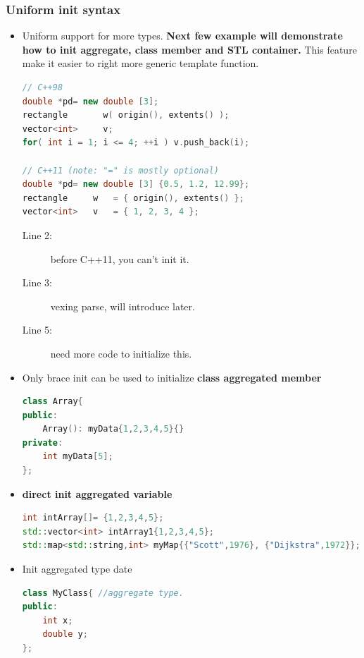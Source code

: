 \documentclass[a4paper,11pt,twoside]{book}
\begin{document}
\subsubsection{Uniform init syntax}
\begin{itemize}

\item Uniform support for more types. \textbf{Next few example will demonstrate how to init aggregate, class member and STL container.} This feature make it easier to right more generic template function. 
\begin{lstlisting}[frame=single, language=c++,mathescape=true]
// C++98 
double *pd= new double [3];
rectangle       w( origin(), extents() );     
vector<int>     v;
for( int i = 1; i <= 4; ++i ) v.push_back(i);

// C++11 (note: "=" is mostly optional)
double *pd= new double [3] {0.5, 1.2, 12.99};
rectangle     w   = { origin(), extents() }; 
vector<int>   v   = { 1, 2, 3, 4 };
\end{lstlisting}
\begin{description}
	\item[Line 2:] before C++11, you can't init it.
	
	\item[Line 3:] vexing parse, will introduce later.
	
	\item[Line 5:] need more code  to initialize this.
\end{description}
	
	\item Only brace init can be used to initialize \textbf{class aggregated member}

\begin{lstlisting}[frame=single, language=c++,mathescape=true]
class Array{
public:
	Array(): myData{1,2,3,4,5}{}    
private:
	int myData[5];
};
\end{lstlisting}

\item \textbf{direct init aggregated variable}
\begin{lstlisting}[frame=single, language=c++,mathescape=true]
int intArray[]= {1,2,3,4,5};   
std::vector<int> intArray1{1,2,3,4,5};  
std::map<std::string,int> myMap{{"Scott",1976}, {"Dijkstra",1972}};
\end{lstlisting}
	
\item Init aggregated type date
\begin{lstlisting}[frame=single, language=c++,mathescape=true]
class MyClass{ //aggregate type.
public: 
	int x;
	double y;
};
	

\end{lstlisting}
\end{itemize}
\end{document}
